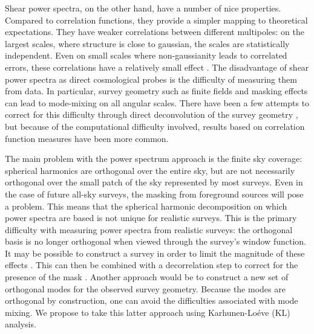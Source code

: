Shear power spectra, on the other hand, have a number of nice properties.
Compared to correlation functions, they provide a simpler mapping
to theoretical expectations.  They have
weaker correlations between different multipoles: on the largest scales,
where structure is close to gaussian, the scales are statistically independent.
Even on small scales where non-gaussianity leads to correlated errors,
these correlations have a relatively small effect \citep{Takada09}.
The disadvantage of shear power spectra as direct cosmological probes is
the difficulty of measuring them from data.  In particular, survey geometry
such as finite fields and masking effects can lead to mode-mixing on all
angular scales.  There have been a few attempts to correct for this
difficulty through direct deconvolution of the survey geometry
\citep{Brown03, Hikage11}, but because of the computational difficulty
involved, results based on correlation function measures have been
more common.

The main problem with the power spectrum approach is the finite sky coverage:
spherical harmonics are orthogonal over the entire sky, but are not
necessarily orthogonal over the small patch of the sky represented by
most surveys.  Even in the case of future all-sky surveys, the masking from
foreground sources will pose a problem.  This means
that the spherical harmonic decomposition on which power spectra are based
is not unique for realistic surveys.  This is the primary difficulty with
measuring power spectra from realistic surveys: the orthogonal basis is no
longer orthogonal when viewed through the survey's window function.
It may be possible to construct a survey in order to
limit the magnitude of these effects
\citep[see][for some approaches]{Kilbinger04, Kilbinger06}.
This can then be combined with a decorrelation step to correct for the
presence of the mask \citep[e.g.][]{Hikage11}.
Another approach would be to construct a new set of orthogonal modes for the
observed survey geometry.  Because the modes are orthogonal by construction,
one can avoid the difficulties associated with mode mixing. We propose to
take this latter approach using Karhunen-Lo\'{e}ve (KL) analysis.

